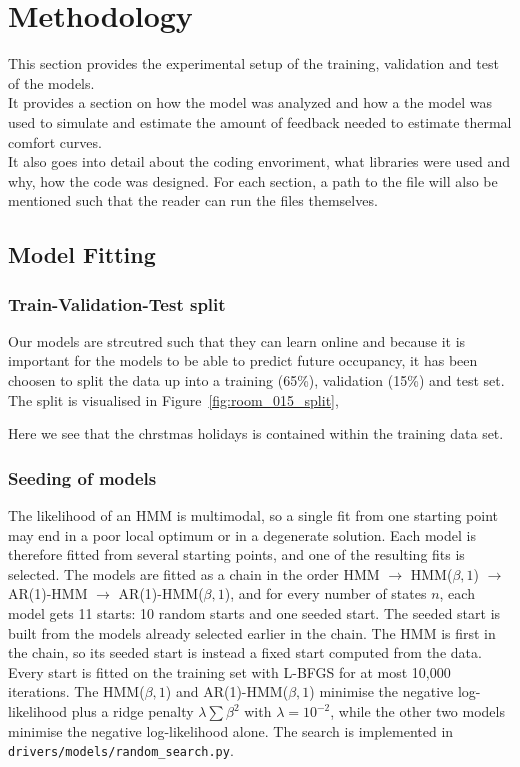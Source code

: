 \chapter{Methodology}
This section provides the experimental setup of the training, validation and test of the models. \\
It provides a section on how the model was analyzed and how a the model was used to simulate and estimate the 
amount of feedback needed to estimate thermal comfort curves.\\ 
It also goes into detail about the coding envoriment, what libraries were used and why, 
how the code was designed. For each section, a path to the file will also be mentioned such that 
the reader can run the files themselves. 
\section{Model Fitting}
\subsection{Train-Validation-Test split} 
Our models are strcutred such that they can learn online and because it is important for the models to be able 
to predict future occupancy, it has been choosen to split the data up into a training (65\%), validation (15\%) and test set. 
The split is visualised in Figure~\ref{fig:room_015_split}, 

Here we see that the chrstmas holidays is contained within the training data set. 
\subsection{Seeding of models}
The likelihood of an HMM is multimodal, so a single fit from one starting point
may end in a poor local optimum or in a degenerate solution. Each model is
therefore fitted from several starting points, and one of the resulting fits is
selected. The models are fitted as a chain in the order
HMM $\rightarrow$ HMM($\beta, 1$) $\rightarrow$ AR(1)-HMM $\rightarrow$
AR(1)-HMM($\beta, 1$), and for every number of states $n$, each model gets
11 starts: 10 random starts and one seeded start. The seeded start is built
from the models already selected earlier in the chain. The HMM is first in the
chain, so its seeded start is instead a fixed start computed from the data.
Every start is fitted on the training set with L-BFGS for at most 10{,}000
iterations. The HMM($\beta, 1$) and AR(1)-HMM($\beta, 1$) minimise the negative
log-likelihood plus a ridge penalty $\lambda \sum \beta^2$ with
$\lambda = 10^{-2}$, while the other two models minimise the negative
log-likelihood alone. The search is implemented in
\texttt{drivers/models/random\_search.py}.

